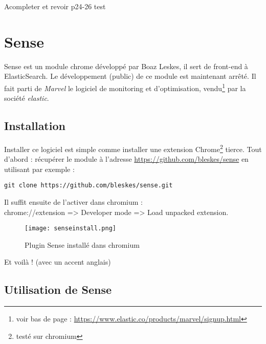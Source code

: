 Acompleter et revoir
p24-26
 test


\section{Sense}
Sense est un module chrome développé par Boaz Leskes, il sert de front-end à ElasticSearch.
Le développement (public) de ce module est maintenant arrêté. Il fait parti de 
\emph{Marvel} le logiciel de monitoring et d'optimisation, vendu\footnote{voir bas 
de page : \url{https://www.elastic.co/products/marvel/signup.html}} 
par la société \emph{elastic}.


\subsection{Installation}
Installer ce logiciel est simple comme installer une extension Chrome\footnote{testé sur chromium}
tierce.
Tout d'abord : récupérer le module à l'adresse \url{https://github.com/bleskes/sense}
en utilisant par exemple : 
\begin{lstlisting}[style=code,label=lst:gitclonesense]
git clone https://github.com/bleskes/sense.git
\end{lstlisting}

Il suffit ensuite de l'activer dans chromium :\\ 
chrome://extension => Developer mode => Load unpacked extension.

\begin{figure}[H]
\center
\texttt{[image: senseinstall.png]}
\label{fig:senseinstall}
\caption{Plugin Sense installé dans chromium}
\end{figure}

Et voilà ! \footnotesize{(avec un accent anglais)}

\subsection{Utilisation de Sense}

